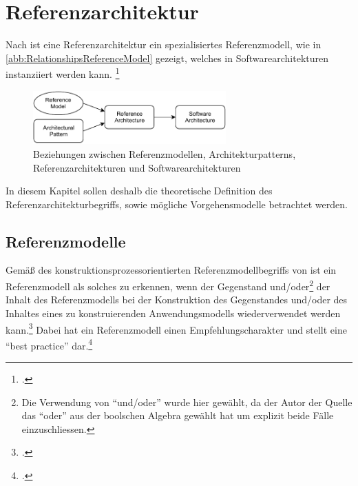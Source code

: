 \section{Referenzarchitektur}\label{theorie:referenzmodellierung}
Nach \citeauthor{Bass.2010} ist eine Referenzarchitektur ein spezialisiertes Referenzmodell, wie in \autoref{abb:RelationshipsReferenceModel} gezeigt, welches in Softwarearchitekturen instanziiert werden kann. \footcite[Vgl.][S.~17~f.]{Bass.2010} 

\begin{figure}[H]
\centering
\includegraphics[width=0.66\textwidth]{graphics/Relationships-reference-models.pdf}
\caption[Beziehungen zwischen Referenzmodellen, Architekturpatterns, Referenzarchitekturen und Softwarearchitekturen]{Beziehungen zwischen Referenzmodellen, Architekturpatterns, Referenzarchitekturen und Softwarearchitekturen\footnotemark}
\label{abb:RelationshipsReferenceModel}
\end{figure}

In diesem Kapitel sollen deshalb die theoretische Definition des Referenzarchitekturbegriffs, sowie mögliche Vorgehensmodelle betrachtet werden.



\subsection{Referenzmodelle}

Gemäß des konstruktionsprozessorientierten Referenzmodellbegriffs von \citeauthor{vomBrocke.2003} ist ein Referenzmodell als solches zu erkennen, wenn der Gegenstand und/oder\footnote{Die Verwendung von \enquote{und/oder} wurde hier gewählt, da der Autor der Quelle das \enquote{oder} aus der boolschen Algebra gewählt hat um explizit beide Fälle einzuschliessen.} der Inhalt des Referenzmodells bei der Konstruktion des Gegenstandes und/oder des Inhaltes eines zu konstruierenden Anwendungsmodells wiederverwendet werden kann.\footcite[Vgl.][34]{vomBrocke.2003} Dabei hat ein Referenzmodell einen Empfehlungscharakter und stellt eine \enquote{best practice} dar.\footcite[Vgl.][31]{vomBrocke.2003} 

